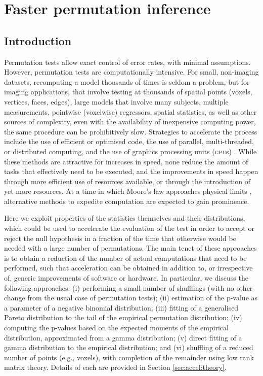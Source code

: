 \chapter{Faster permutation inference}
\label{sec:accel}
\setstretch{\lspac}

\section{Introduction}
\label{sec:accel:intro}
\setstretch{\lspac}

Permutation tests allow exact control of error rates, with minimal assumptions. However, permutation tests are computationally intensive. For small, non-imaging datasets, recomputing a model thousands of times is seldom a problem, but for imaging applications, that involve testing at thousands of spatial points (voxels, vertices, faces, edges), large models that involve many subjects, multiple measurements, pointwise (voxelwise) regressors, spatial statistics, as well as other sources of complexity, even with the availability of inexpensive computing power, the same procedure can be prohibitively slow. Strategies to accelerate the process include the use of efficient or optimised code, the use of parallel, multi-threaded, or distributed computing, and the use of graphics processing units (\textsc{gpu}s) \citep[for example applications of the latter, see][]{Eklund2012, Eklund2013, Hernandez2013}. While these methods are attractive for increases in speed, none reduce the amount of tasks that effectively need to be executed, and the improvements in speed happen through more efficient use of resources available, or through the introduction of yet more resources. At a time in which Moore's law \citep{Moore1965} approaches physical limits \citep{Waldrop2016}, alternative methods to expedite computation are expected to gain prominence.

Here we exploit properties of the statistics themselves and their distributions, which could be used to accelerate the evaluation of the test in order to accept or reject the null hypothesis in a fraction of the time that otherwise would be needed with a large number of permutations. The main tenet of these approaches is to obtain a reduction of the number of actual computations that need to be performed, such that acceleration can be obtained in addition to, or irrespective of, generic improvements of software or hardware. In particular, we discuss the following approaches: ({i}) performing a small number of shufflings (with no other change from the usual case of permutation tests); ({ii}) estimation of the p-value as a parameter of a negative binomial distribution; ({iii}) fitting of a generalised Pareto distribution to the tail of the empirical permutation distribution; ({iv}) computing the p-values based on the expected moments of the empirical distribution, approximated from a gamma distribution; ({v}) direct fitting of a gamma distribution to the empirical distribution; and ({vi}) shuffling of a reduced number of points (e.g., voxels), with completion of the remainder using low rank matrix theory. Details of each are provided in Section \ref{sec:accel:theory}.

